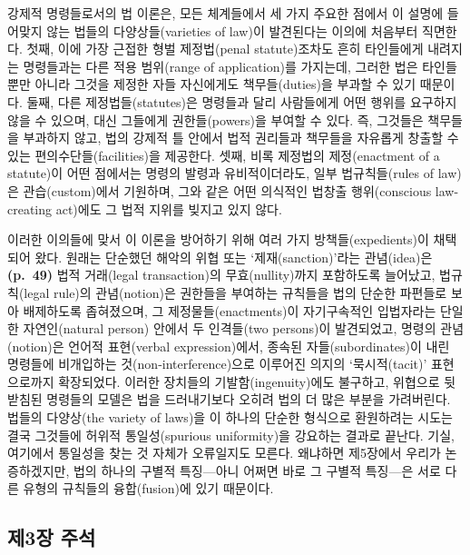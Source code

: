 강제적 명령들로서의 법 이론은, 모든 체계들에서 세 가지 주요한 점에서 이
설명에 들어맞지 않는 법들의 다양상들(varieties of law)이 발견된다는
이의에 처음부터 직면한다. 첫째, 이에 가장 근접한 형벌 제정법(penal
statute)조차도 흔히 타인들에게 내려지는 명령들과는 다른 적용 범위(range
of application)를 가지는데, 그러한 법은 타인들뿐만 아니라 그것을 제정한
자들 자신에게도 책무들(duties)을 부과할 수 있기 때문이다. 둘째, 다른
제정법들(statutes)은 명령들과 달리 사람들에게 어떤 행위를 요구하지 않을
수 있으며, 대신 그들에게 권한들(powers)을 부여할 수 있다. 즉, 그것들은
책무들을 부과하지 않고, 법의 강제적 틀 안에서 법적 권리들과 책무들을
자유롭게 창출할 수 있는 편의수단들(facilities)을 제공한다. 셋째, 비록
제정법의 제정(enactment of a statute)이 어떤 점에서는 명령의 발령과
유비적이더라도, 일부 법규칙들(rules of law)은 관습(custom)에서 기원하며,
그와 같은 어떤 의식적인 법창출 행위(conscious law-creating act)에도 그
법적 지위를 빚지고 있지 않다.

이러한 이의들에 맞서 이 이론을 방어하기 위해 여러 가지
방책들(expedients)이 채택되어 왔다. 원래는 단순했던 해악의 위협 또는
‘제재(sanction)’라는 관념(idea)은 \textbf{(p.~49)} 법적 거래(legal
transaction)의 무효(nullity)까지 포함하도록 늘어났고, 법규칙(legal
rule)의 관념(notion)은 권한들을 부여하는 규칙들을 법의 단순한 파편들로
보아 배제하도록 좁혀졌으며, 그 제정물들(enactments)이 자기구속적인
입법자라는 단일한 자연인(natural person) 안에서 두 인격들(two persons)이
발견되었고, 명령의 관념(notion)은 언어적 표현(verbal expression)에서,
종속된 자들(subordinates)이 내린 명령들에 비개입하는
것(non-interference)으로 이루어진 의지의 ‘묵시적(tacit)’ 표현으로까지
확장되었다. 이러한 장치들의 기발함(ingenuity)에도 불구하고, 위협으로
뒷받침된 명령들의 모델은 법을 드러내기보다 오히려 법의 더 많은 부분을
가려버린다. 법들의 다양상(the variety of laws)을 이 하나의 단순한
형식으로 환원하려는 시도는 결국 그것들에 허위적 통일성(spurious
uniformity)을 강요하는 결과로 끝난다. 기실, 여기에서 통일성을 찾는 것
자체가 오류일지도 모른다. 왜냐하면 제5장에서 우리가 논증하겠지만, 법의
하나의 구별적 특징---아니 어쩌면 바로 그 구별적 특징---은 서로 다른
유형의 규칙들의 융합(fusion)에 있기 때문이다.

\newpage

\subsection{제3장 주석}\label{uxc81c3uxc7a5-uxc8fcuxc11d}


